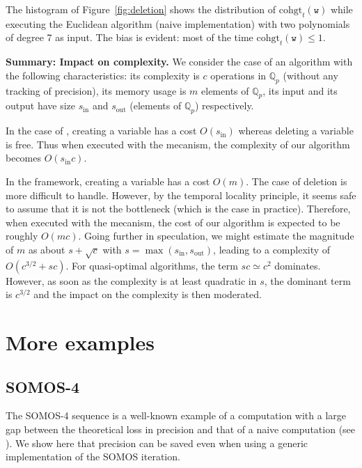 \documentclass[sigconf]{acmart}
\newcommand{\Q}{\mathbb Q}
\newcommand{\Qp}{\Q_p}
\newcommand{\ttw}{\texttt{w}\xspace}
\newcommand{\ZpLC}{\text{\color{output} \rm \tt ZpLC}\xspace}
\newcommand{\ZpLF}{\text{\color{output} \rm \tt ZpLF}\xspace}
\newcommand{\cohgt}{\text{cohgt}}
\newcommand{\inp}{\text{in}}
\newcommand{\out}{\text{out}}
\theoremstyle{definition}
\begin{document}
%
The histogram of Figure~\ref{fig:deletion} shows 
the distribution of $\cohgt_t(\ttw)$ while executing the Euclidean
algorithm (naive implementation) with two polynomials of degree $7$
as input. The bias is evident: most of the time $\cohgt_t(\ttw) \leq
1$.

\medskip

\noindent \textbf{Summary: Impact on complexity.}
% 
We consider the case of an algorithm with the following characteristics: 
its complexity is $c$ operations in $\Qp$ (without any tracking of 
precision), its memory usage is $m$ elements of $\Qp$, its input and its 
output have size $s_\inp$ and $s_\out$ (elements of $\Qp$) respectively.

In the case of \ZpLF, creating a variable has a cost $O(s_\inp)$ 
whereas deleting a variable is free. 
Thus when executed with the \ZpLF mecanism, the complexity of our
algorithm becomes $O(s_\inp c)$.

In the \ZpLC framework, creating a variable has a cost $O(m)$. The case 
of deletion is more difficult to handle. However, by the temporal 
locality principle, it seems safe to assume that it is not the 
bottleneck (which is the case in practice). Therefore, when executed 
with the \ZpLF mecanism, the cost of our algorithm is expected to be 
roughly $O(mc)$. Going further in speculation, we might estimate the 
magnitude of $m$ as about $s + \sqrt c$ with $s = \max(s_\inp, 
s_\out)$, leading to a complexity of $O(c^{3/2} + sc)$. For 
quasi-optimal algorithms, the term $sc \simeq c^2$ dominates. However, 
as soon as the complexity is at least quadratic in $s$, the dominant 
term is $c^{3/2}$ and the impact on the complexity is then moderated.

\section{More examples}

\subsection{SOMOS-4}

The SOMOS-4 sequence is a well-known example
of a computation with a large gap between
the theoretical loss in precision
and that of a naive computation (see \cite{caruso-roe-vaccon:14a}).
We show here that precision can be saved
even when using a generic implementation
of the SOMOS iteration.

\smallskip
\end{document}
